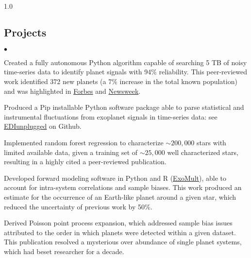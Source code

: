 \documentclass[margin,line, 12pt]{res}
\newenvironment{list2}{
  \begin{list}{$\bullet$}{%
      \setlength{\itemsep}{0.05in}
      \setlength{\parsep}{0in} \setlength{\parskip}{0in}
      \setlength{\topsep}{0.0in} \setlength{\partopsep}{0in}
      \setlength{\leftmargin}{0.2in}}}{\end{list}}
\begin{document}
\begin{spacing}{1.0}
\begin{resume}
\section{Projects}
	\begin{list2}
	
	\item Created a fully autonomous Python algorithm capable of searching 5 TB of noisy time-series data to identify planet signals with 94\% reliability. This peer-reviewed work identified 372 new planets (a 7\% increase in the total known population) and was highlighted in \href{https://www.forbes.com/sites/jamiecartereurope/2021/06/11/we-found-372-new-alien-planets-using-a-long-dead-telescope-say-scientists/}{Forbes} and \href{https://www.newsweek.com/astronomers-discover-366-new-worlds-gas-giants-kepler-k2-exoplanets-nasa-1653254}{Newsweek}.
	
	\item Produced a Pip installable Python software package able to parse statistical and instrumental fluctuations from exoplanet signals in time-series data: see \href{https://github.com/jonzink/EDI_Vetter_unplugged}{EDIunplugged} on Github.
	
	\item Implemented random forest regression to characterize $\sim200,000$ stars with limited available data, given a training set of $\sim25,000$ well characterized stars, resulting in a highly cited a peer-reviewed publication.
	 
	
	
	\item Developed forward modeling software in Python and R (\href{https://github.com/jonzink/ExoMult}{ExoMult}), able to account for intra-system correlations and sample biases. This work produced an estimate for the occurrence of an Earth-like planet around a given star, which reduced the uncertainty of previous work by 50\%.  
	
	\item Derived Poisson point process expansion, which addressed sample bias issues attributed to the order in which planets were detected within a given dataset. This publication resolved a mysterious over abundance of single planet systems, which had beset researcher for a decade.
	

\end{list2}
\end{resume}
\end{spacing}
\end{document}
